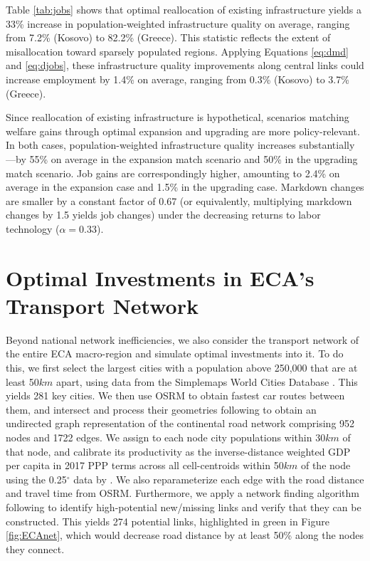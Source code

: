 \documentclass[a4paper]{article}
\begin{document}
\vspace{1cm}

Table \ref{tab:jobs} shows that optimal reallocation of existing infrastructure yields a 33\% increase in population-weighted infrastructure quality on average, ranging from 7.2\% (Kosovo) to 82.2\% (Greece). This statistic reflects the extent of misallocation toward sparsely populated regions. Applying Equations \ref{eq:dmd} and \ref{eq:djobs}, these infrastructure quality improvements along central links could increase employment by 1.4\% on average, ranging from 0.3\% (Kosovo) to 3.7\% (Greece). \newline

Since reallocation of existing infrastructure is hypothetical, scenarios matching welfare gains through optimal expansion and upgrading are more policy-relevant. In both cases, population-weighted infrastructure quality increases substantially---by 55\% on average in the expansion match scenario and 50\% in the upgrading match scenario. Job gains are correspondingly higher, amounting to 2.4\% on average in the expansion case and 1.5\% in the upgrading case. Markdown changes are smaller by a constant factor of 0.67 (or equivalently, multiplying markdown changes by 1.5 yields job changes) under the decreasing returns to labor technology ($\alpha = 0.33$). 

\section{Optimal Investments in ECA's Transport Network}

Beyond national network inefficiencies, we also consider the transport network of the entire ECA macro-region and simulate optimal investments into it. To do this, we first select the largest cities with a population above 250,000 that are at least 50$km$ apart, using data from the Simplemaps World Cities Database \citep{simplemaps}. This yields 281 key cities. We then use OSRM to obtain fastest car routes between them, and intersect and process their geometries following \citet{krantz2024optimal} to obtain an undirected graph representation of the continental road network comprising 952 nodes and 1722 edges. We assign to each node city populations within 30$km$ of that node, and calibrate its productivity as the inverse-distance weighted GDP per capita in 2017 PPP terms across all cell-centroids within 50$km$ of the node using the 0.25$^\circ$ data by \citet{LGEAW}. We also reparameterize each edge with the road distance and travel time from OSRM. Furthermore, we apply a network finding algorithm following \citet{krantz2024optimal} to identify high-potential new/missing links and verify that they can be constructed. This yields 274 potential links, highlighted in green in Figure \ref{fig:ECAnet}, which would decrease road distance by at least 50\% along the nodes they connect. 
\end{document}

